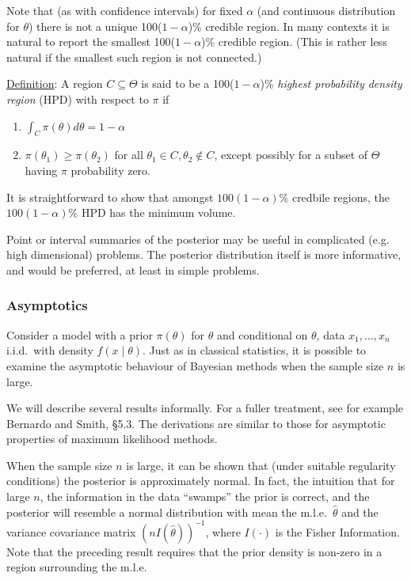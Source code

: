 \documentclass[12pt]{article}
\def\ni{\noindent}
\begin{document}
Note that (as with confidence intervals) for fixed $\alpha$ (and
continuous distribution for $\theta$) there is not a unique
100($1-\alpha$)\% credible region.  In many contexts it is natural to
report the smallest 100($1-\alpha$)\% credible region.  (This is rather
less natural if the smallest such region is not connected.)

\ni\underline{Definition}: A region $C \subseteq \Theta$ is said to be a
100($1-\alpha$)\% {\it highest probability density region} (HPD) with
respect to $\pi$ if
\begin{enumerate}
\item $\int_C \pi(\theta)d\theta = 1-\alpha$
\item $\pi(\theta_1) \geq \pi(\theta_2)$ for all $\theta_1 \in
  C,\theta_2 \notin C$, except possibly for a subset of $\Theta$ having
  $\pi$ probability zero.
\end{enumerate}
It is straightforward to show that amongst $100(1-\alpha)$\% credbile
regions, the $100(1-\alpha)$\% HPD has the minimum volume.

Point or
interval summaries of the posterior may be useful in complicated
(e.g. high dimensional) problems.  The posterior distribution itself
is more informative, and would be preferred, at least in simple
problems.

\subsubsection{Asymptotics}

Consider a model with a prior $\pi(\theta)$ for $\theta$ and
conditional on $\theta$, data $x_1,\ldots,x_n$ i.i.d.\ with density
$f(x\mid \theta)$.  Just as in classical statistics, it is possible to
examine the asymptotic behaviour of Bayesian methods when the sample
size $n$ is large.

We will describe several results informally.  For a fuller treatment,
see for example Bernardo and Smith,  \S5.3.  The derivations are
similar to those for asymptotic properties of maximum likelihood
methods.

When the sample size $n$ is large, it can be shown that (under suitable
regularity conditions) the posterior is approximately normal.  In
fact, the intuition that for large $n$, the information in the data
``swamps'' the prior is correct, and the posterior will resemble a
normal distribution with mean the m.l.e.\ $\hat{\theta}$ and the
variance covariance matrix $(nI(\hat{\theta}))^{-1}$, where $I(\cdot)$
is the Fisher Information.  Note that the preceding result requires
that the prior density is non-zero in a region surrounding the m.l.e.
\end{document}
